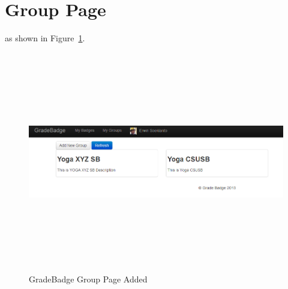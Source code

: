 \newpage
\section{Group Page}
 as shown in Figure~\ref{fig:group-page2}. 

\vspace{3em}
\begin{figure}[H]
\begin{center}
\includegraphics[height=3.8in,width=6.5in]{images/group-page2.png}
\caption{GradeBadge Group Page Added}
\label{fig:group-page2}
\end{center}
\end{figure}


